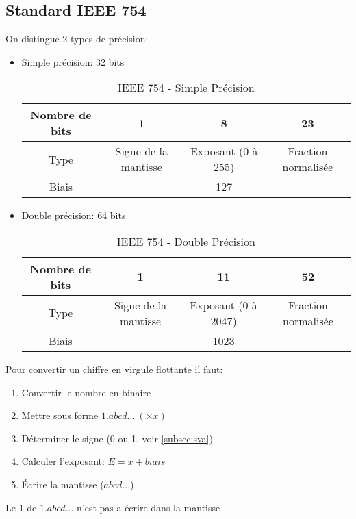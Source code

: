 \subsection{Standard IEEE 754}
On distingue 2 types de précision:
\begin{itemize}
	\item Simple précision: 32 bits\\
	\begin{table}[H]
		\centering
		\begin{tabular}{|c|c|c|c|}
			\hline
			Nombre de bits & 1 & 8 & 23\\
			\hline
			Type & Signe de la mantisse & Exposant (0 à 255) & Fraction normalisée\\
			\hline
			Biais & & 127 &\\
			\hline
		\end{tabular}
		\caption{IEEE 754 - Simple Précision}
	\end{table}
	\item Double précision: 64 bits\\
	\begin{table}[H]
		\centering
		\begin{tabular}{|c|c|c|c|}
			\hline
			Nombre de bits & 1 & 11 & 52\\
			\hline
			Type & Signe de la mantisse & Exposant (0 à 2047) & Fraction normalisée\\
			\hline
			Biais & & 1023 &\\
			\hline
		\end{tabular}
		\caption{IEEE 754 - Double Précision}
	\end{table}
\end{itemize}
Pour convertir un chiffre en virgule flottante il faut:
\begin{enumerate}
	\item Convertir le nombre en binaire
	\item Mettre sous forme $1.abcd...\ (\times x)$
	\item Déterminer le signe (0 ou 1, voir \autoref{subsec:sva})
	\item Calculer l'exposant: $E=x+biais$
	\item Écrire la mantisse ($abcd...$) 
\end{enumerate}
\danger Le 1 de $1.abcd...$ n'est pas a écrire dans la mantisse